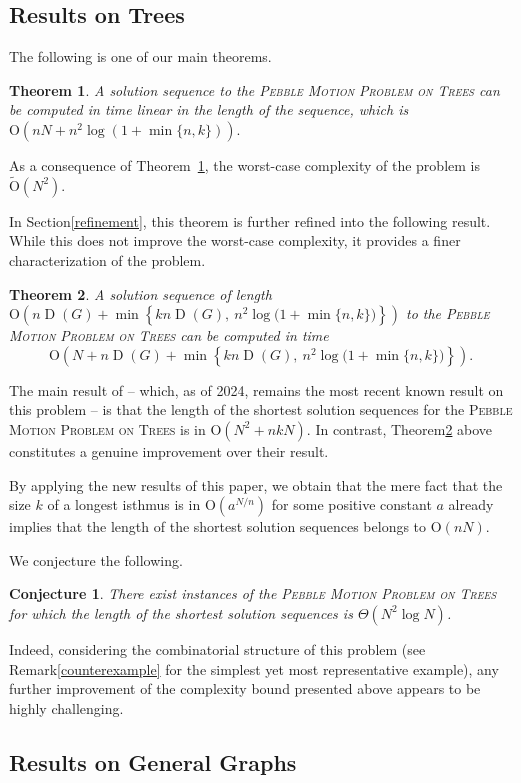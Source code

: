 \documentclass[letter,11pt]{article}
\newtheorem{thm}{Theorem}
\newtheorem{conj}{Conjecture}
\theoremstyle{definition}
\theoremstyle{definition}
\DeclareMathOperator{\D}{D}
\newcommand{\1}{\boldmath$~1~$\unboldmath}
\newcommand{\Ord}{\mathrm{O}}
\newcommand{\tume}{\hspace*{0.2em}}
\begin{document}
\subsection{Results on Trees}
\setcounter{thm}{0}
The following is one of our main theorems. 
\begin{thm}\label{main}
A solution sequence to the \textsc{Pebble Motion Problem on Trees} can be computed 
in time linear in the length of the sequence, which is $\Ord(nN + n^2 \log(1+\min\{n, k\})).$
\end{thm}
As a consequence of Theorem~\ref{main}, the worst-case complexity of 
the problem is $\tilde{\Ord}(N^2)$. 

In Section\tume\ref{refinement}, this theorem is further refined into the following result.
While this does not improve the worst-case complexity, it provides a finer characterization of the problem.
\begin{thm}\label{refinement1}
A solution sequence of length 
$\Ord\left(n\D(G) + \min\left\{k n \D(G),\ n^{2} \log\big(1+\min\{n, k\}\big)\right\}\right)$
to the \textsc{Pebble Motion Problem on Trees} can be computed in time 
$$\Ord\left(N+n\D(G) + \min\left\{k n \D(G),\ n^{2} \log\big(1+\min\{n, k\}\big)\right\}\right).$$
\end{thm}
The main result of \cite{WOS:001177663400002} -- which, as of 2024, remains the most recent known 
result on this problem -- is that the length of the shortest solution sequences for 
the \textsc{Pebble Motion Problem on Trees} is in $\Ord(N^2 + nkN)$.
In contrast, Theorem\tume\ref{refinement1} above constitutes a genuine improvement over their result.

By applying the new results of this paper, we obtain that the mere fact that the size $k$ of 
a longest isthmus is in $\Ord(a^{N/n})$ for some positive constant $a$ already implies that 
the length of the shortest solution sequences belongs to $\Ord(nN)$.

We conjecture the following.
\begin{conj}\label{conjecture}
There exist instances of the \textsc{Pebble Motion Problem on Trees} for 
which the length of the shortest solution sequences is $\Theta(N^2\log N)$.
\end{conj}
Indeed, considering the combinatorial structure of this problem (see Remark\tume\ref{counterexample} 
for the simplest yet most representative example), any further improvement of the complexity bound 
presented above appears to be highly challenging.


\subsection{Results on General Graphs}
\end{document}
